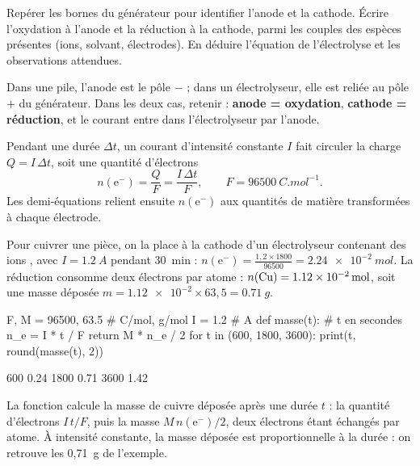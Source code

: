 \begin{savoirfaire}
Repérer les bornes du générateur pour identifier l'anode et la cathode. Écrire l'oxydation à l'anode et la réduction à
la cathode, parmi les couples des espèces présentes (ions, solvant, électrodes). En déduire l'équation de
l'électrolyse et les observations attendues.
\end{savoirfaire}
\begin{attention}
Dans une pile, l'anode est le pôle $-$ ; dans un électrolyseur, elle est reliée au pôle $+$ du générateur. Dans les deux
cas, retenir : \textbf{anode = oxydation}, \textbf{cathode = réduction}, et le courant entre dans l'électrolyseur par
l'anode.
\end{attention}
\begin{propriete}
Pendant une durée $\Delta t$, un courant d'intensité constante $I$ fait circuler la charge $Q=I\,\Delta t$, soit une
quantité d'électrons
\[n(\mathrm{e}^-)=\frac{Q}{F}=\frac{I\,\Delta t}{F},\qquad F=\qty{96500}{C.mol^{-1}}.\]
Les demi-équations relient ensuite $n(\mathrm{e}^-)$ aux quantités de matière transformées à chaque électrode.
\end{propriete}
\begin{exemple}
Pour cuivrer une pièce, on la place à la cathode d'un électrolyseur contenant des ions , avec $I=\qty{1,2}{A}$
pendant 30~min : $n(\mathrm{e}^-)=\frac{1{,}2\times1800}{\num{96500}}=\qty{2,24e-2}{mol}$. La réduction
 consomme deux électrons par atome : $n(\ce{Cu})=\qty{1,12e-2}{mol}$, soit une masse déposée
$m=\num{1.12e-2}\times63{,}5=\qty{0,71}{g}$.
\end{exemple}
\begin{codecote}[0.58]
\begin{pythoncol}
F, M = 96500, 63.5     # C/mol, g/mol
I = 1.2                # A
def masse(t):          # t en secondes
    n_e = I * t / F
    return M * n_e / 2
for t in (600, 1800, 3600):
    print(t, round(masse(t), 2))
\end{pythoncol}
\begin{consolecol}
600 0.24
1800 0.71
3600 1.42
\end{consolecol}
\cote
\fontsize{9.5}{12.5}\selectfont
{}\par\smallskip
La fonction calcule la masse de cuivre déposée après une durée $t$ : la quantité d'électrons $I\,t/F$, puis la masse
$M\,n(\mathrm{e}^-)/2$, deux électrons étant échangés par atome. À intensité constante, la masse déposée est
proportionnelle à la durée : on retrouve les 0,71~g de l'exemple.
\end{codecote}
